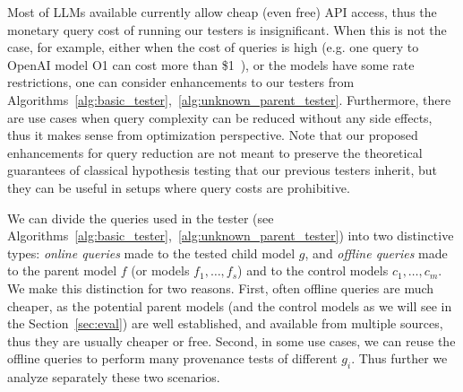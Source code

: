 Most of LLMs available currently allow cheap (even free) API access, thus the monetary query cost of running our testers is insignificant. 
When this is not the case, for example, either when the cost of queries is high (e.g. one query to OpenAI model O1 can cost more than \$1~\cite{openai_pricing}), or the models have some rate restrictions, one can consider enhancements to our testers from Algorithms~\ref{alg:basic_tester},~\ref{alg:unknown_parent_tester}. Furthermore, there are use cases when query complexity can be reduced without any side effects, thus it makes sense from optimization perspective. 
Note that our proposed enhancements for query reduction are not meant to preserve the theoretical guarantees of classical hypothesis testing that our previous testers inherit, but they can be useful in setups where query costs are prohibitive. 

We can divide the queries used in the tester (see Algorithms~\ref{alg:basic_tester},~\ref{alg:unknown_parent_tester}) into two distinctive types: \emph{online queries} made to the tested child model $g$, and \emph{offline queries} made to the parent model $f$ (or models $f_1,\ldots,f_s$) and to the control models $c_1,\ldots,c_m$. We make this distinction for two reasons. First, often offline queries are much cheaper, as the potential parent models (and the control models  as we will see in the Section~\ref{sec:eval}) are well established, and available from multiple sources, thus they are usually cheaper or free. Second, in some use cases, we can reuse the offline queries to perform many provenance tests of different $g_i$. Thus further we analyze separately these two scenarios.

